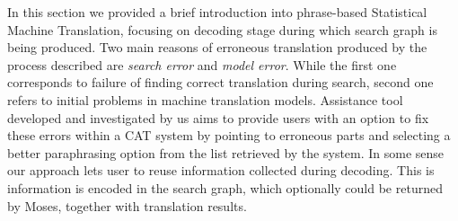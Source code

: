 In this section we provided a brief introduction into phrase-based Statistical Machine Translation, focusing on decoding stage during which search graph is being produced. Two main reasons of erroneous translation produced by the process described are \textit{search error} and \textit{model error}. While the first one corresponds to failure of finding correct translation during search, second one refers to initial problems in machine translation models. Assistance tool developed and investigated by us aims to provide users with an option to fix these errors within a CAT system by pointing to erroneous parts and selecting a better paraphrasing option from the list retrieved by the system. In some sense our approach lets user to reuse information collected during decoding. This is information is encoded in the search graph, which optionally could be returned by Moses, together with translation results. 



